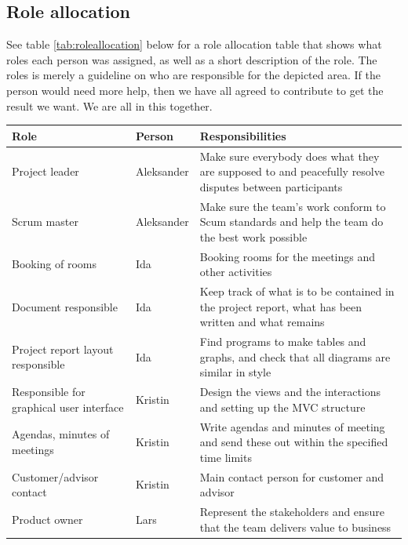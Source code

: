 \subsection{Role allocation}
See table \ref{tab:roleallocation} below for a role allocation table that shows what roles each person was assigned, as well as a short description of the role. The roles is merely a guideline on who are responsible for the depicted area. If the person would need more help, then we have all agreed to contribute to get the result we want. We are all in this together.
\begin{table}[h!]
\begin{center}
\begin{tabularx}{\linewidth}{>{\setlength\hsize{.5\hsize}}X|>{\setlength\hsize{0.3\hsize}}X|>{\setlength\hsize{1\hsize}}X} \hline
\textbf{Role} & \textbf{Person} & \textbf{Responsibilities} \\ \hline \hline

Project leader & Aleksander & Make sure everybody does what they are supposed to and peacefully resolve disputes between participants \\  \hline
Scrum master & Aleksander & Make sure the team’s work conform to Scum standards and help the team do the best work possible \\ \hline

Booking of rooms & Ida & Booking rooms for the meetings and other activities \\ \hline
Document responsible & Ida &Keep track of what is to be contained in the project report, what has been written and what remains \\ \hline
Project report layout responsible & Ida &Find programs to make tables and graphs, and check that all diagrams are similar in style \\ \hline

Responsible for graphical user interface & Kristin & Design the views and the interactions and setting up the MVC structure \\ \hline
Agendas, minutes of meetings & Kristin &Write agendas and minutes of meeting and send these out within the specified time limits \\ \hline
Customer/advisor contact & Kristin & Main contact person for customer and advisor \\ \hline

Product owner & Lars & Represent the stakeholders and ensure that the team delivers value to business\\ \hline


\end{tabularx}
\end{center}
\end{table}
